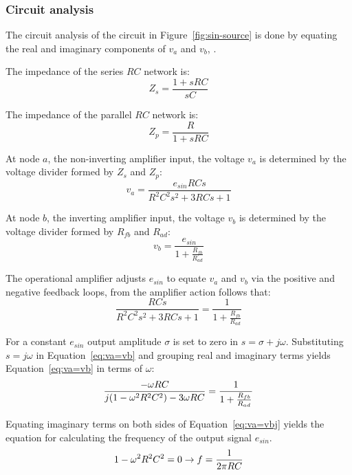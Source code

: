 \subsubsection{Circuit analysis}
The circuit analysis of the circuit in Figure~\vref{fig:sin-source} is
done by equating the real and imaginary components of $v_a$ and $v_b$,
\cite[p31]{analog}.

The impedance of the series $RC$ network is:
\begin{equation}
	Z_{s} = \frac{1 + sRC}{sC}
	\label{eq:zs}
\end{equation}

The impedance of the parallel $RC$ network is:
\begin{equation}
	Z_{p} = \frac{R}{1 + sRC}
	\label{eq:zp}
\end{equation}

At node $a$, the non-inverting amplifier input, the voltage $v_a$ is
determined by the voltage divider formed by $Z_{s}$ and $Z_{p}$:
\begin{equation}
	v_{a} = \frac{e_{sin}RCs}{R^2C^2s^2 + 3RCs + 1}
	\label{eq:va}
\end{equation}

At node $b$, the inverting amplifier input, the voltage $v_b$ is
determined by the voltage divider formed by $R_{fb}$ and $R_{ad}$:
\begin{equation}
	v_{b} = \frac{e_{sin}}{1 + \frac{R_{fb}}{R_{ad}}}
	\label{eq:vb}
\end{equation}

The operational amplifier adjusts $e_{sin}$ to equate $v_a$ and $v_b$
via the positive and negative feedback loops, from the amplifier
action follows that:
\begin{equation}
	\frac{RCs}{R^2C^2s^2 + 3RCs + 1} = \frac{1}{1 + \frac{R_{fb}}{R_{ad}}}
	\label{eq:va=vb}
\end{equation}

For a constant $e_{sin}$ output amplitude $\sigma$ is set to zero in
$s = \sigma +j\omega$.  Substituting $s = j\omega$ in
Equation~\ref{eq:va=vb} and grouping real and imaginary terms yields
Equation~\ref{eq:va=vb} in terms of $\omega$:
\begin{equation}
	\frac{-\omega\/RC}{j(1 - \omega^2R^2C^2) - 3\omega\/RC} =
	\frac{1}{1 + \frac{R_{fb}}{R_{ad}}} 
	\label{eq:va=vbj}
\end{equation}

Equating imaginary terms on both sides of Equation~\ref{eq:va=vbj}
yields the equation for calculating the frequency of the output signal
$e_{sin}$.
\begin{equation}
	1 - \omega\/^2R^2C^2 = 0
	\rightarrow f = \frac{1}{2\pi\/RC}
	\label{eq:f}
\end{equation}

